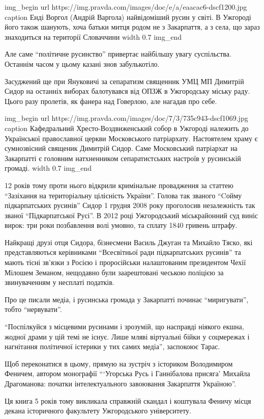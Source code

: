 \ifcmt
img_begin 
    url https://img.pravda.com/images/doc/e/a/eaacac6-dscf1200.jpg
    caption Енді Воргол (Андрій Варгола) \dshM найвідоміший русин у світі. В Ужгороді його також шанують, хоча батьки митця родом не з Закарпаття, а з села, що зараз знаходиться на території Словаччини
    width 0.7
img_end
\fi

Але саме \enquote{політичне русинство} привертає найбільшу увагу суспільства. Останнім
часом у цьому казані знов забулькотіло.

Засуджений ще при Януковичі за сепаратизм священник УМЦ МП Димитрій Сидор на
останніх виборах балотувався від ОПЗЖ в Ужгородську міську раду. Цього разу
пролетів, як фанера над Говерлою, але нагадав про себе.

\ifcmt
img_begin 
        url https://img.pravda.com/images/doc/7/3/735c943-dscf1069.jpg
        caption Кафедральний Хресто-Воздвиженський собор в Ужгороді належить до Української православної церкви Московського патріархату. Настоятелем храму є сумнозвісний священик Димитрій Сидор. Саме Московський патріархат на Закарпатті є головним натхненником сепаратистських настроїв у русинській громаді.
        width 0.7
img_end
\fi

12 років тому проти нього відкрили кримінальне провадження за статтею
\enquote{Зазіхання на територіальну цілісність України}. Голова так званого \enquote{Cойму
підкарпатських русинів} Сидор 1 грудня 2008 року проголосив незалежність так
званої \enquote{Підкарпатської Русі}. В 2012 році Ужгородський міськрайонний суд виніс
вирок: три роки позбавлення волі \dshM умовно, та сплату 1840 гривень штрафу.

Найкращі друзі отця Сидора, бізнесмени Василь Джуган та Михайло Тяско, які
представляються керівниками \enquote{Всесвітньої ради підкарпатських русинів} та мають
тісні зв'язки з Росією і проросійськи налаштованим президентом Чехії Мілошем
Земаном, нещодавно були заарештовані чеською поліцією за звинуваченням у
несплаті податків.

Про це писали медіа, і русинська громада у Закарпатті починає \enquote{миригувати},
тобто \enquote{нервувати}.

\enquote{Поспілкуйся з місцевими русинами і зрозумій, що насправді ніякого екшна,
жодної драми у цій темі не існує. Лише мляві віртуальні бійки у соцмережах і
нагнітання політичної істерики у тих самих медіа}, \dshM заспокоює Тарас.

Щоб переконатися в цьому, прямую на зустріч з істориком Володимиром Феничем,
автором монографії \enquote{\enquote{Угорська Русь і Ганнібалова присяга} Михайла Драгоманова:
початки інтелектуального завоювання Закарпаття Україною}.

Ця книга 5 років тому викликала справжній скандал і коштувала Феничу місця
декана історичного факультету Ужгородського університету. 

